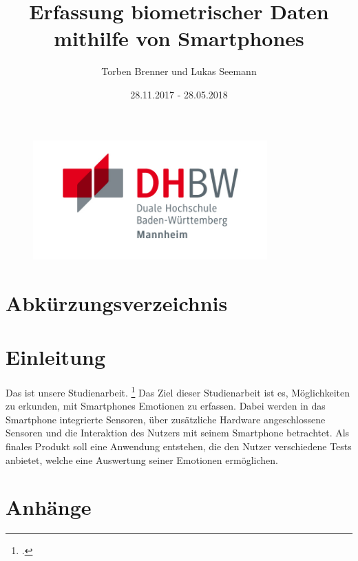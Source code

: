\documentclass[12pt,titlepage,ngerman]{article}
\begin{document}
\begin{titlepage}
	\begin{figure}
		\centering
		\includegraphics[width=9cm]{Bilder/DHBW_MA_Logo.jpg}
	\end{figure}%
	\title{Erfassung biometrischer Daten mithilfe von Smartphones}	
	\date{28.11.2017 - 28.05.2018}
	\author{Torben Brenner und Lukas Seemann}
	\maketitle
\end{titlepage}
\singlespacing
{}
\tableofcontents
\newpage
\section*{Abkürzungsverzeichnis}
\begin{acronym}[*********]
\end{acronym}
\newpage
{}
\listoffigures
\newpage

\listoftables
\newpage

\onehalfspacing
\section{Einleitung}
Das ist unsere Studienarbeit. \footcite[Vgl.][S. 9000]{Test123}
Das Ziel dieser Studienarbeit ist es, Möglichkeiten zu erkunden, mit Smartphones Emotionen zu erfassen. 
Dabei werden in das Smartphone integrierte Sensoren, über zusätzliche Hardware angeschlossene Sensoren und die Interaktion des 
Nutzers mit seinem Smartphone betrachtet.
Als finales Produkt soll eine Anwendung entstehen, die den Nutzer verschiedene Tests anbietet, welche eine Auswertung seiner 
Emotionen ermöglichen.
\newpage

\newpage

\newpage

\newpage


\newpage
{}
\printbibliography
\newpage

\section*{Anhänge}
\end{document}
